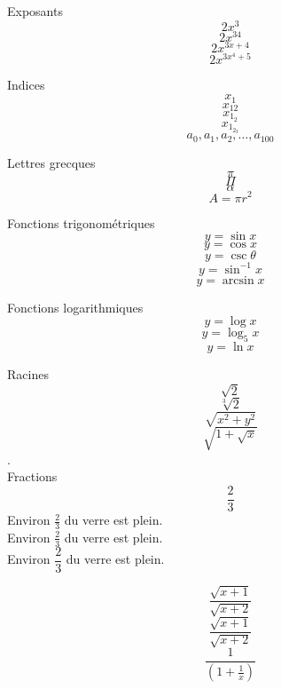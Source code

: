 \documentclass[11pt]{article}
\begin{document}
Exposants 
$$2x^3$$ 
$$2x^{34}$$ 
$$2x^{3x+4}$$ 
$$2x^{3x^4+5}$$ 

Indices 
$$x_1$$ 
$$x_{12}$$ 
$$x_{1_2}$$ 
$$x_{1_{2_3}}$$
$$a_0, a_1, a_2, \ldots, a_{100}$$

Lettres grecques
$$\pi$$
$$\Pi$$
$$\alpha$$
$$A=\pi r^2$$

Fonctions trigonométriques
$$y=\sin x$$
$$y=\cos x$$
$$y=\csc\theta$$
$$y=\sin^{-1} x$$
$$y=\arcsin x$$

Fonctions logarithmiques
$$y=\log x$$
$$y=\log_5 x$$
$$y=\ln x$$

Racines
$$\sqrt{2}$$
$$\sqrt[3]{2}$$
$$\sqrt{x^2+y^2}$$
$$\sqrt{ 1+\sqrt{x} }$$. \\[16pt]

Fractions
$$\frac{2}{3}$$
Environ $\displaystyle \frac{2}{3}$ du verre est plein.\\[16pt]
Environ $\frac{2}{3}$ du verre est plein.\\[6pt]
Environ $\dfrac{2}{3}$ du verre est plein.

$$\frac{\sqrt{x+1}}{\sqrt{x+2}}$$
$$\frac{\sqrt{x+1}}{\sqrt{x+2}}$$
$$\frac{1}{ (1+\frac{1}{x}) }$$
\end{document}

